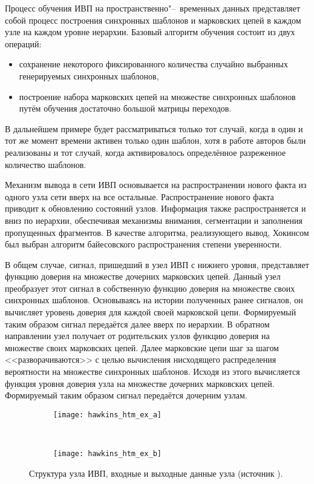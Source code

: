 Процесс обучения ИВП на пространственно"--~временных данных представляет собой процесс построения синхронных шаблонов и марковских цепей в каждом узле на каждом уровне иерархии. Базовый алгоритм обучения состоит из двух операций:
\begin{itemize}
	\item сохранение некоторого фиксированного количества случайно выбранных генерируемых синхронных шаблонов,
	\item построение набора марковских цепей на множестве синхронных шаблонов путём обучения достаточно большой матрицы переходов.
\end{itemize}
В дальнейшем примере будет рассматриваться только тот случай, когда в один и тот же момент времени активен только один шаблон, хотя в работе авторов были реализованы и тот случай, когда активировалось определённое разреженное количество шаблонов.

Механизм вывода в сети ИВП основывается на распространении нового факта из одного узла сети вверх на все остальные. Распространение нового факта приводит к обновлению состояний узлов. Информация также распространяется и вниз по иерархии, обеспечивая механизмы внимания, сегментации и заполнения пропущенных фрагментов. В качестве алгоритма, реализующего вывод, Хокинсом был выбран алгоритм байесовского распространения степени уверенности.

В общем случае, сигнал, пришедший в узел ИВП с нижнего уровня, представляет функцию доверия на множестве дочерних марковских цепей. Данный узел преобразует этот сигнал в собственную функцию доверия на множестве своих синхронных шаблонов. Основываясь на истории полученных ранее сигналов, он вычисляет уровень доверия для каждой своей марковской цепи. Формируемый таким образом сигнал передаётся далее вверх по иерархии. В обратном направлении узел получает от родительских узлов функцию доверия на множестве своих марковских цепей. Далее марковские цепи шаг за шагом <<разворачиваются>> с целью вычисления нисходящего распределения вероятности на множестве синхронных шаблонов. Исходя из этого вычисляется функция уровня доверия узла на множестве дочерних марковских цепей. Формируемый таким образом сигнал передаётся дочерним узлам.

\begin{figure}[h]
	\centering
	\begin{subfigure}[b]{0.45\textwidth}
		\texttt{[image: hawkins\_htm\_ex\_a]}
		\caption{}
		\label{fg:hawkins_htm_ex_a}
	\end{subfigure}
	~
	\begin{subfigure}[b]{0.45\textwidth}
		\texttt{[image: hawkins\_htm\_ex\_b]}
		\caption{}
		\label{fg:hawkins_htm_ex_b}
	\end{subfigure}
	\caption{Структура узла ИВП, входные и выходные данные узла (источник \cite{Hawkins2009}).}
	\label{fg:hawkins_htm_ex}
\end{figure}

